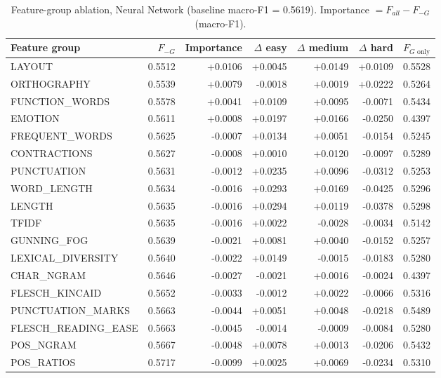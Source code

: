 \begin{table}[ht]
\centering
\small
\caption{Feature-group ablation, Neural Network (baseline macro-F1 = 0.5619). Importance $= F_{all} - F_{-G}$ (macro-F1).}
\label{tab:ablation-features-neural}
\begin{tabular}{lrrrrrr}
\toprule
Feature group & $F_{-G}$ & Importance & $\Delta$ easy & $\Delta$ medium & $\Delta$ hard & $F_{G\text{ only}}$ \\
\midrule
LAYOUT & 0.5512 & +0.0106 & +0.0045 & +0.0149 & +0.0109 & 0.5528 \\
ORTHOGRAPHY & 0.5539 & +0.0079 & -0.0018 & +0.0019 & +0.0222 & 0.5264 \\
FUNCTION\_WORDS & 0.5578 & +0.0041 & +0.0109 & +0.0095 & -0.0071 & 0.5434 \\
EMOTION & 0.5611 & +0.0008 & +0.0197 & +0.0166 & -0.0250 & 0.4397 \\
FREQUENT\_WORDS & 0.5625 & -0.0007 & +0.0134 & +0.0051 & -0.0154 & 0.5245 \\
CONTRACTIONS & 0.5627 & -0.0008 & +0.0010 & +0.0120 & -0.0097 & 0.5289 \\
PUNCTUATION & 0.5631 & -0.0012 & +0.0235 & +0.0096 & -0.0312 & 0.5253 \\
WORD\_LENGTH & 0.5634 & -0.0016 & +0.0293 & +0.0169 & -0.0425 & 0.5296 \\
LENGTH & 0.5635 & -0.0016 & +0.0294 & +0.0119 & -0.0378 & 0.5298 \\
TFIDF & 0.5635 & -0.0016 & +0.0022 & -0.0028 & -0.0034 & 0.5142 \\
GUNNING\_FOG & 0.5639 & -0.0021 & +0.0081 & +0.0040 & -0.0152 & 0.5257 \\
LEXICAL\_DIVERSITY & 0.5640 & -0.0022 & +0.0149 & -0.0015 & -0.0183 & 0.5280 \\
CHAR\_NGRAM & 0.5646 & -0.0027 & -0.0021 & +0.0016 & -0.0024 & 0.4397 \\
FLESCH\_KINCAID & 0.5652 & -0.0033 & -0.0012 & +0.0022 & -0.0066 & 0.5316 \\
PUNCTUATION\_MARKS & 0.5663 & -0.0044 & +0.0051 & +0.0048 & -0.0218 & 0.5489 \\
FLESCH\_READING\_EASE & 0.5663 & -0.0045 & -0.0014 & -0.0009 & -0.0084 & 0.5280 \\
POS\_NGRAM & 0.5667 & -0.0048 & +0.0078 & +0.0013 & -0.0206 & 0.5432 \\
POS\_RATIOS & 0.5717 & -0.0099 & +0.0025 & +0.0069 & -0.0234 & 0.5310 \\
\bottomrule
\end{tabular}
\end{table}

